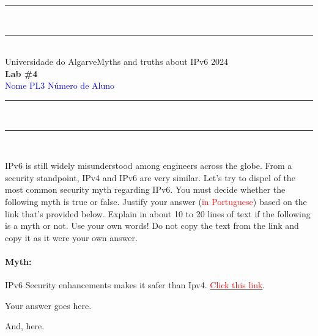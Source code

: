 \documentclass{article}
\begin{document}
\begin{center}
\rule{\textwidth}{.0075in} \\
\rule[3mm]{\textwidth}{.0075in}\\

Universidade do Algarve\hfill Myths and truths about IPv6 \hfill 2024\\[3ex]

{\Large\bf Lab \#4} \\[3ex]

 \textcolor{blue}{Nome} \hfill  
 \textcolor{blue}{PL3} \hfill
 \textcolor{blue}{Número de Aluno}\\

\rule{\textwidth}{.0075in} \\
\rule[3mm]{\textwidth}{.0075in} \\
\end{center}

\bigskip

\noindent
IPv6 is still widely misunderstood among engineers across the
globe. From a security standpoint, IPv4 and IPv6 are very
similar. Let's try to dispel of the most common security myth
regarding IPv6. You must decide whether the following myth is true or
false. Justify your answer (\textcolor{red}{in Portuguese}) based on
the link that's provided below. Explain in about 10 to 20 lines of
text if the following is a myth or not. Use your own words! Do not
copy the text from the link and copy it as it were your own answer.

\noindent
\paragraph{Myth:} IPv6 Security enhancements  makes it safer than Ipv4. 
\href{https://www.ipv6now.com.au/primers/IPv6PacketSecurity.php}{\textcolor{red}{Click this link}}.\\

\bigskip

\noindent

{\Large
\noindent
Your answer goes here. \\

\medskip

\noindent
And, here.
}
\end{document}

